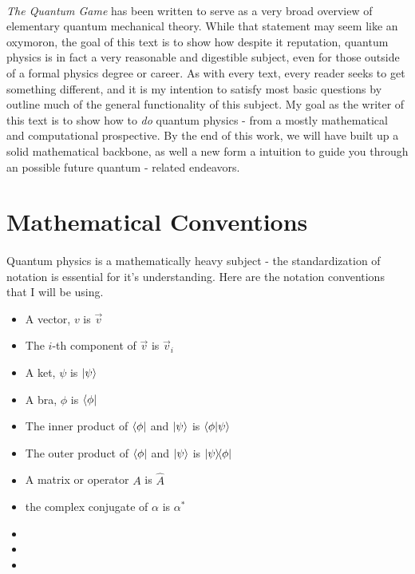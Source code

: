 \documentclass[12pt,letterpaper]{book}
\begin{document}
\paragraph*{}\textit{The Quantum Game} has been written to serve as a very broad overview of elementary quantum mechanical theory. While that statement may seem like an oxymoron, the goal of this text is to show how despite it reputation, quantum physics is in fact a very reasonable and digestible subject, even for those outside of a formal physics degree or career. As with every text, every reader seeks to get something different, and it is my intention to satisfy most basic questions  by outline much of the general functionality of this subject. My goal as the writer of this text is to show how to \textit{do} quantum physics - from a mostly mathematical and computational prospective. By the end of this work, we will have built up a solid mathematical backbone, as well a new form a intuition to guide you through an possible future quantum - related endeavors.

\vspace*{6cm}

\pagebreak


\section*{Mathematical Conventions}

\paragraph*{}Quantum physics is a mathematically heavy subject - the standardization of notation is essential for it's understanding. Here are the notation conventions that I will be using.

\begin{itemize}

\item A vector, $v$ is $\vec{v}$
\item The $i$-th component of $\vec{v}$ is $\vec{v}_i$
\item A ket, $\psi$ is $\ket{\psi}$
\item A bra, $\phi$ is $\bra{\phi}$
\item The inner product of $\bra{\phi}$ and $\ket{\psi}$ is 
$\braket{\phi}{\psi}$
\item The outer product of $\bra{\phi}$ and $\ket{\psi}$ is 
$\ketbra{\psi}{\phi}$
\item A matrix or operator $A$ is $\hat{A}$
\item the complex conjugate of $\alpha$ is $\alpha^*$
\item
\item
\item

\end{itemize}
\end{document}
